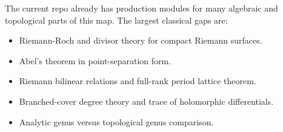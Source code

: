 The current repo already has production modules for many algebraic and
topological parts of this map. The largest classical gaps are:

\begin{itemize}
\item Riemann-Roch and divisor theory for compact Riemann surfaces.
\item Abel's theorem in point-separation form.
\item Riemann bilinear relations and full-rank period lattice theorem.
\item Branched-cover degree theory and trace of holomorphic differentials.
\item Analytic genus versus topological genus comparison.
\end{itemize}
